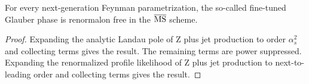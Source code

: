 \begin{proposition}\label{thm:1}
For every next-generation Feynman parametrization, the so-called
fine-tuned Glauber phase is renormalon free in the $\overline{\rm MS}$
scheme.
\end{proposition}

\begin{proof}
Expanding the analytic Landau pole of Z plus jet production to order
$\alpha_s^2$ and collecting terms gives the result. The remaining terms
are power suppressed. Expanding the renormalized profile likelihood of Z
plus jet production to next-to-leading order and collecting terms gives
the result.
\end{proof}

